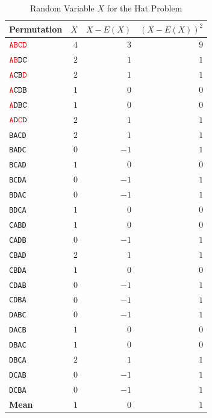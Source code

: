 \documentclass[jou]{apa6}
\begin{document}
{\scriptsize
\begin{table}[h!]
\begin{center}
\caption{Random Variable $X$ for the Hat Problem}
\begin{tabular}{|l|r|r|r|} \hline
\label{table:t1}
{\bf Permutation} & $X$ & $X-E(X)$ & $(X-E(X))^2$ \\ \hline
$\textcolor{red}{\mathtt{ABCD}}$ & $4$ & $3$ & $9$ \\ \hline
$\textcolor{red}{\mathtt{AB}}\mathtt{DC}$ & $2$ & $1$ & $1$ \\ \hline
$\textcolor{red}{\mathtt{A}}\mathtt{CB}\textcolor{red}{\mathtt{D}}$ & $2$ & $1$ & $1$ \\ \hline
$\textcolor{red}{\mathtt{A}}\mathtt{CDB}$ & $1$ & $0$ & $0$ \\ \hline
$\textcolor{red}{\mathtt{A}}\mathtt{DBC}$ & $1$ & $0$ & $0$ \\ \hline
$\textcolor{red}{\mathtt{A}}\mathtt{D}\textcolor{red}{\mathtt{C}}\mathtt{D}$ & $2$ & $1$ & $1$ \\ \hline

{\tt BACD} & $2$ & $1$ & $1$ \\ \hline
{\tt BADC} & $0$ & $-1$ & $1$ \\ \hline
{\tt BCAD} & $1$ & $0$ & $0$ \\ \hline
{\tt BCDA} & $0$ & $-1$ & $1$ \\ \hline
{\tt BDAC} & $0$ & $-1$ & $1$ \\ \hline
{\tt BDCA} & $1$ & $0$ & $0$ \\ \hline

{\tt CABD} & $1$ & $0$ & $0$ \\ \hline
{\tt CADB} & $0$ & $-1$ & $1$ \\ \hline
{\tt CBAD} & $2$ & $1$ & $1$ \\ \hline
{\tt CBDA} & $1$ & $0$ & $0$ \\ \hline
{\tt CDAB} & $0$ & $-1$ & $1$ \\ \hline
{\tt CDBA} & $0$ & $-1$ & $1$ \\ \hline

{\tt DABC} & $0$ & $-1$ & $1$ \\ \hline
{\tt DACB} & $1$ & $0$ & $0$ \\ \hline
{\tt DBAC} & $1$ & $0$ & $0$ \\ \hline
{\tt DBCA} & $2$ & $1$ & $1$ \\ \hline
{\tt DCAB} & $0$ & $-1$ & $1$ \\ \hline
{\tt DCBA} & $0$ & $-1$ & $1$ \\ \hline\hline
{\bf Mean} & $1$ & $0$ & $1$ \\ \hline
\end{tabular}
\end{center}
\end{table}
}
\end{document}
